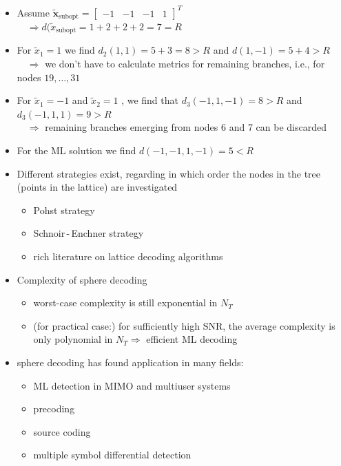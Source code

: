\documentclass[a4paper, 10pt]{article}
\begin{document}
\begin{itemize}
	\item Assume $\tilde{\mathbf{x}}_{\text{subopt}} = \begin{bmatrix} -1 & -1 & -1 & 1	\end{bmatrix}^T $ \\ $ \quad \Rightarrow d(\tilde{x}_{\text{subopt}} = 1 + 2 + 2 + 2 = 7 = R $
	\item For $\tilde{x}_1 = 1 $ we find $ d_2(1,1) = 5 + 3 = 8 > R $ and $ d(1,-1) = 5 + 4 > R $ \\ $ \quad\Rightarrow $ we don't have to calculate metrics for remaining branches, i.e., for nodes $19, \ldots ,31 $
	\item For $ \tilde{x}_1 = -1 $ and $ \tilde{x}_2 = 1$ , we find that $d_3(-1, 1, -1) = 8 > R $ and $ d_3(-1, 1, 1) = 9 > R$ \\ $ \quad\Rightarrow $ remaining branches emerging from nodes 6 and 7 can be discarded
	\item For the ML solution we find $d(-1, -1, 1, -1) = 5 < R $
	\item Different strategies exist, regarding in which order the nodes in the tree (points in the lattice) are investigated
	\begin{itemize}
		\item Pohst strategy
		\item Schnoir\,-\,Enchner strategy
		\item rich literature on lattice decoding algorithms
	\end{itemize}
	\item Complexity of sphere decoding
	\begin{itemize}
		\item worst-case complexity is still exponential in $N_T$
		\item (for practical case:) for sufficiently high SNR, the average complexity is only polynomial in $N_T \Rightarrow $ efficient ML decoding
	\end{itemize}		
	\item sphere decoding has found application in many fields:
	\begin{itemize}
		\item ML detection in MIMO and multiuser systems
		\item precoding
		\item source coding
		\item multiple symbol differential detection
	\end{itemize}
\end{itemize}
\newpage
\end{document}
